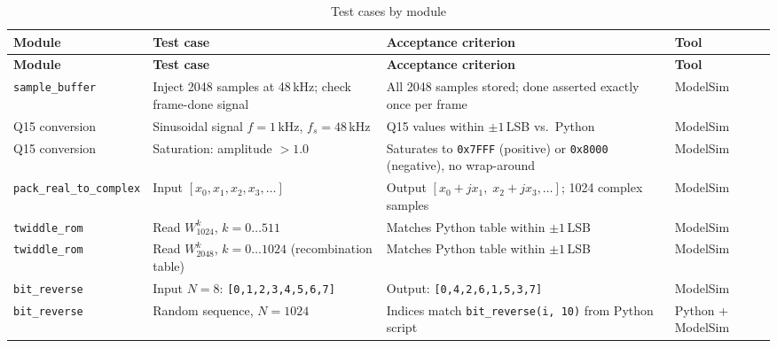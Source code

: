 \documentclass[12pt, a4paper]{article}
\begin{document}
\begin{longtable}{p{2.8cm} p{4.2cm} p{4.8cm} p{2.6cm}}
    \caption{Test cases by module} \label{tab:testcases} \\
    \toprule
    \textbf{Module} & \textbf{Test case} & \textbf{Acceptance criterion} & \textbf{Tool} \\
    \midrule
    \endfirsthead

    \toprule
    \textbf{Module} & \textbf{Test case} & \textbf{Acceptance criterion} & \textbf{Tool} \\
    \midrule
    \endhead

    \bottomrule
    \endlastfoot

    \texttt{sample\_buffer}
        & Inject 2048 samples at 48\,kHz; check frame-done signal
        & All 2048 samples stored; done asserted exactly once per frame
        & ModelSim \\[3pt]

    Q15 conversion
        & Sinusoidal signal $f{=}1$\,kHz, $f_s{=}48$\,kHz
        & Q15 values within $\pm 1$\,LSB vs.\ Python
        & ModelSim \\[3pt]

    Q15 conversion
        & Saturation: amplitude $> 1.0$
        & Saturates to \texttt{0x7FFF} (positive) or \texttt{0x8000}
          (negative), no wrap-around
        & ModelSim \\[3pt]

    \texttt{pack\_real\_to\_complex}
        & Input $[x_0, x_1, x_2, x_3, \ldots]$
        & Output $[x_0{+}jx_1,\; x_2{+}jx_3, \ldots]$; 1024 complex samples
        & ModelSim \\[3pt]

    \texttt{twiddle\_rom}
        & Read $W_{1024}^k$, $k{=}0\ldots511$
        & Matches Python table within $\pm 1$\,LSB
        & ModelSim \\[3pt]

    \texttt{twiddle\_rom}
        & Read $W_{2048}^k$, $k{=}0\ldots1024$ (recombination table)
        & Matches Python table within $\pm 1$\,LSB
        & ModelSim \\[3pt]

    \texttt{bit\_reverse}
        & Input $N{=}8$: \texttt{[0,1,2,3,4,5,6,7]}
        & Output: \texttt{[0,4,2,6,1,5,3,7]}
        & ModelSim \\[3pt]

    \texttt{bit\_reverse}
        & Random sequence, $N{=}1024$
        & Indices match \texttt{bit\_reverse(i, 10)} from Python script
        & Python + ModelSim \\[3pt]


\end{longtable}
\end{document}
